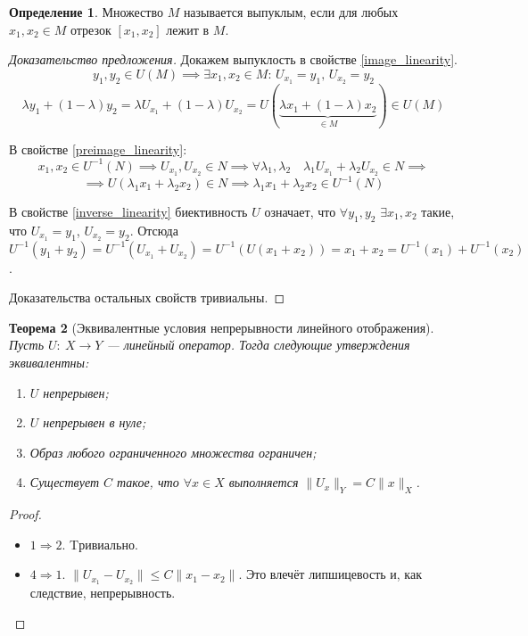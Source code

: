 \documentclass[11pt,openany,a4paper]{scrartcl}
\theoremstyle{plain}
\newtheorem{theorem}{Теорема}[section]
\theoremstyle{definition}
\newtheorem{definition}[theorem]{Определение}
\begin{document}
\begin{definition}
    Множество $M$ называется выпуклым, если для любых $x_1,x_2 \in M$ отрезок
    $[x_1, x_2]$ лежит в $M$.
\end{definition}
\begin{proof}[Доказательство предложения]
    Докажем выпуклость в свойстве \ref{image_linearity}.
    $$
    y_1, y_2 \in U(M) \implies \exists x_1, x_2 \in M:\, U_{x_1} = y_1,\,
    U_{x_2} = y_2
    $$
    $$
    \lambda y_1 + (1-\lambda)y_2 = \lambda U_{x_1} + (1 - \lambda)U_{x_2} =
    U(\underbrace{\lambda x_1 + (1-\lambda)x_2}_{\in M}) \in U(M)
    $$
    
    В свойстве \ref{preimage_linearity}:
    $$
    x_1, x_2 \in U^{-1}(N) \implies U_{x_1}, U_{x_2} \in N \implies
    \forall \lambda_1, \lambda_2\quad \lambda_1 U_{x_1} + \lambda_2 U_{x_2} \in N
    \implies
    $$
    $$
    \implies U(\lambda_1 x_1 + \lambda_2 x_2) \in N \implies
    \lambda_1x_1 + \lambda_2x_2 \in U^{-1}(N)
    $$
    
    В свойстве \ref{inverse_linearity} биективность $U$ означает, что
    $\forall y_1, y_2$ $\exists x_1, x_2$ такие, что $U_{x_1} = y_1$,
    $U_{x_2} = y_2$. Отсюда $U^{-1}(y_1+y_2) = U^{-1}(U_{x_1} + U_{x_2}) =
    U^{-1}(U(x_1 + x_2)) = x_1 + x_2 = U^{-1}(x_1) + U^{-1}(x_2)$.
    
    Доказательства остальных свойств тривиальны.
\end{proof}

\begin{theorem}[Эквивалентные условия непрерывности линейного отображения]
    Пусть $U:~X \to Y$ — линейный оператор. Тогда следующие утверждения
    эквивалентны:
    \begin{enumerate}
        \item $U$ непрерывен;
        \item $U$ непрерывен в нуле;
        \item Образ любого ограниченного множества ограничен;
        \item Существует $C$ такое, что $\forall x\in X$
        выполняется $\|U_x\|_Y = C\|x\|_X$.
    \end{enumerate}
\end{theorem}
\begin{proof}
\mbox{}
    \begin{itemize}
        \item $1 \Rightarrow 2$. Tривиально.
        \item $4 \Rightarrow 1$. $\|U_{x_1} - U_{x_2}\| \leqslant
        C\|x_1 - x_2\|$. Это влечёт липшицевость и, как следствие, непрерывность.
    \end{itemize} 
\end{proof}
\end{document}
